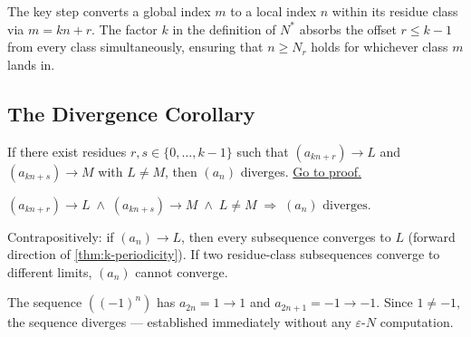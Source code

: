 \begin{remark}
The key step converts a global index $m$ to a local index $n$ within its
residue class via $m = kn + r$. The factor $k$ in the definition of $N^*$
absorbs the offset $r \leq k-1$ from every class simultaneously, ensuring
that $n \geq N_r$ holds for whichever class $m$ lands in.
\end{remark}

\subsection*{The Divergence Corollary}
\label{subsec:residue-divergence}

\begin{proposition}
\label{prop:residue-divergence}
If there exist residues $r, s \in \{0,\ldots,k-1\}$ such that
$(a_{kn+r}) \to L$ and $(a_{kn+s}) \to M$ with $L \neq M$, then
$(a_n)$ diverges.
\hyperref[prf:residue-divergence]{Go to proof.}
\end{proposition}

\begin{remark*}
\end{remark*}


\begin{remark}
$(a_{kn+r}) \to L \;\land\; (a_{kn+s}) \to M \;\land\; L \neq M
\;\Rightarrow\; (a_n) \text{ diverges}$.
\end{remark}

\begin{remark}
Contrapositively: if $(a_n) \to L$, then every subsequence converges to
$L$ (forward direction of \cref{thm:k-periodicity}). If two residue-class
subsequences converge to different limits, $(a_n)$ cannot converge.
\end{remark}

\begin{remark}
The sequence $((-1)^n)$ has $a_{2n} = 1 \to 1$ and $a_{2n+1} = -1 \to -1$.
Since $1 \neq -1$, the sequence diverges --- established immediately without
any $\varepsilon$-$N$ computation.
\end{remark}

